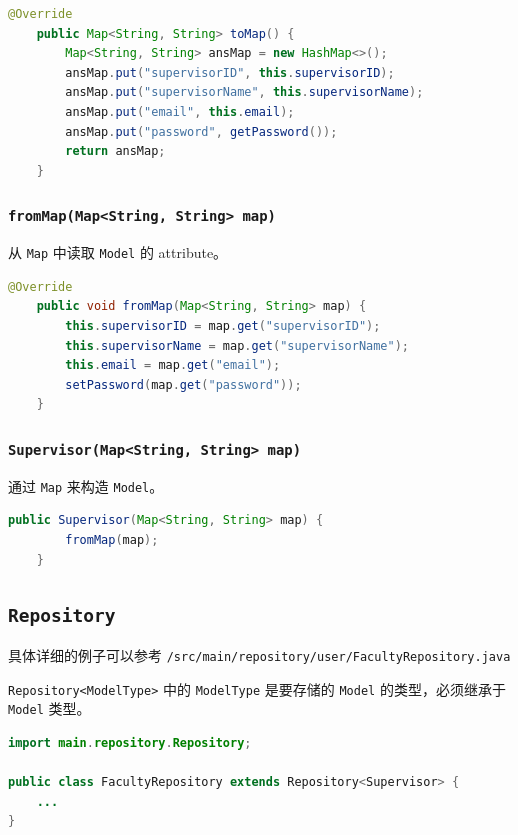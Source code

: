 \documentclass[hyperref,UTF8,12pt,a4paper]{ctexart}
\begin{document}
\begin{lstlisting}[language=Java]
    @Override
    public Map<String, String> toMap() {
        Map<String, String> ansMap = new HashMap<>();
        ansMap.put("supervisorID", this.supervisorID);
        ansMap.put("supervisorName", this.supervisorName);
        ansMap.put("email", this.email);
        ansMap.put("password", getPassword());
        return ansMap;
    }
\end{lstlisting}


\subsubsection{\texttt{fromMap(Map<String, String> map)}}

从 \texttt{Map} 中读取 \texttt{Model} 的 attribute。

\begin{lstlisting}[language=Java]
    @Override
    public void fromMap(Map<String, String> map) {
        this.supervisorID = map.get("supervisorID");
        this.supervisorName = map.get("supervisorName");
        this.email = map.get("email");
		setPassword(map.get("password"));
    }
\end{lstlisting}

\subsubsection{\texttt{Supervisor(Map<String, String> map)}}

通过 \texttt{Map} 来构造 \texttt{Model}。

\begin{lstlisting}[language=Java]
	public Supervisor(Map<String, String> map) {
		fromMap(map);
	}
\end{lstlisting}

\subsection{\texttt{Repository}}

具体详细的例子可以参考 \texttt{/src/main/repository/user/FacultyRepository.java}

\texttt{Repository<ModelType>} 中的 \texttt{ModelType} 是要存储的 \texttt{Model} 的类型，必须继承于 \texttt{Model} 类型。

\begin{lstlisting}[language=Java]
import main.repository.Repository;

public class FacultyRepository extends Repository<Supervisor> {
	...
}
\end{lstlisting}
\end{document}
